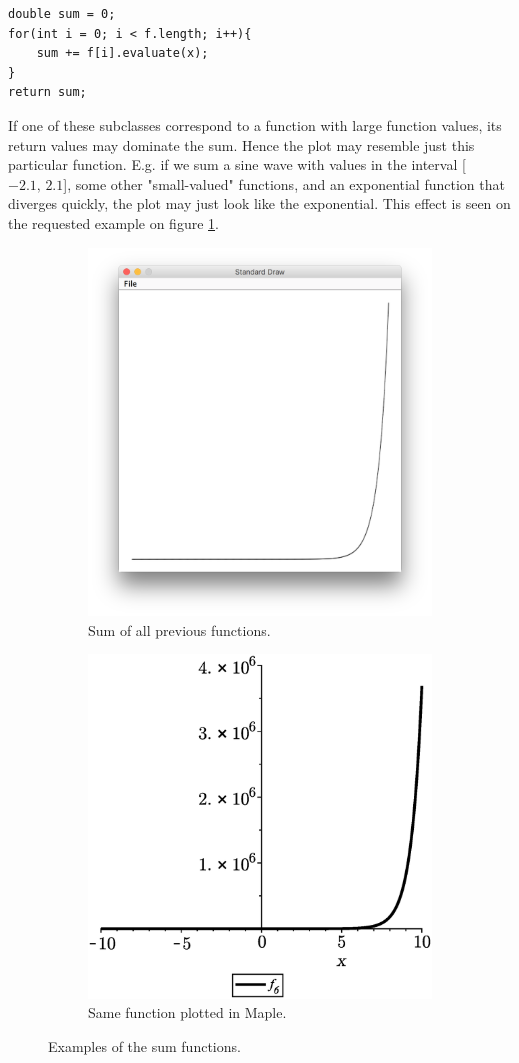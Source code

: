 \begin{lstlisting}
double sum = 0;
for(int i = 0; i < f.length; i++){
	sum += f[i].evaluate(x);
}	
return sum;
\end{lstlisting}

If one of these subclasses correspond to a function with large function values, its return values may dominate the sum. Hence the plot may resemble just this particular function. E.g. if we sum a sine wave with values in the interval [$-2.1, \, 2.1$], some other "small-valued" functions, and an exponential function that diverges quickly, the plot may just look like the exponential. This effect is seen on the requested example on figure \ref{fig:f6}.


\begin{figure}[H]
    \begin{subfigure}{0.5\textwidth}
        \centering
        \includegraphics[width=0.7\linewidth]{GraphicalFunctionPlotter/fig/f6.png} 
        \caption{Sum of all previous functions.}
        \label{fig:f6}
    \end{subfigure}
    \begin{subfigure}{0.5\textwidth}
        \centering
        \includegraphics[width=0.7\linewidth]{GraphicalFunctionPlotter/fig/f6Check.eps}
        \caption{Same function plotted in Maple.}
        \label{fig:f6Check}
    \end{subfigure}
    \caption{Examples of the sum functions.}
\end{figure}

